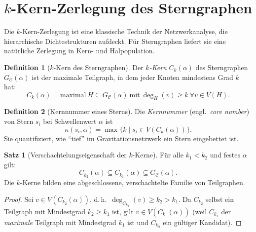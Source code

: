 ﻿\documentclass[a4paper,12pt]{report}
\theoremstyle{definition}
\newtheorem{definition}{Definition}
\newtheorem{satz}{Satz}
\begin{document}
\section{$k$-Kern-Zerlegung des Sterngraphen}
\label{sec:kcore}

Die $k$-Kern-Zerlegung ist eine klassische Technik der Netzwerkanalyse, die hierar\-chische Dichte\-strukturen aufdeckt. Für Sterngraphen liefert sie eine natürliche Zerlegung in Kern- und Halpopulation.

\begin{definition}[$k$-Kern des Sterngraphen]
\label{def:kcore}
Der \emph{$k$-Kern} $C_k(\alpha)$ des Sterngraphen $G_\mathcal{C}(\alpha)$ ist der maximale Teilgraph, in dem jeder Knoten mindestens Grad $k$ hat:
\[
C_k(\alpha) = \mathrm{maximal}\ H \subseteq G_\mathcal{C}(\alpha)\ \text{mit}\ \deg_H(v) \geq k\ \forall v \in V(H).
\]
\end{definition}

\begin{definition}[Kernnummer eines Sterns]
\label{def:kernnummer}
Die \emph{Kernnummer} (engl.\ \emph{core number}) von Stern $s_i$ bei Schwellenwert $\alpha$ ist
\[
\kappa(s_i, \alpha) = \max\{k \mid s_i \in V(C_k(\alpha))\}.
\]
Sie quantifiziert, wie ``tief'' im Gravitationsnetzwerk ein Stern eingebettet ist.
\end{definition}

\begin{satz}[Verschachtelungseigenschaft der $k$-Kerne]
\label{satz:verschachtelung}
Für alle $k_1 < k_2$ und festes $\alpha$ gilt:
\[
C_{k_2}(\alpha) \subseteq C_{k_1}(\alpha) \subseteq G_\mathcal{C}(\alpha).
\]
Die $k$-Kerne bilden eine abgeschlossene, verschachtelte Familie von Teilgraphen.
\end{satz}

\begin{proof}
Sei $v \in V(C_{k_2}(\alpha))$, d.\,h.\ $\deg_{C_{k_2}}(v) \geq k_2 > k_1$. Da $C_{k_2}$ selbst ein Teilgraph mit Mindestgrad $k_2 \geq k_1$ ist, gilt $v \in V(C_{k_1}(\alpha))$ (weil $C_{k_1}$ der \emph{maximale} Teilgraph mit Mindestgrad $k_1$ ist und $C_{k_2}$ ein gültiger Kandidat).
\end{proof}
\end{document}
